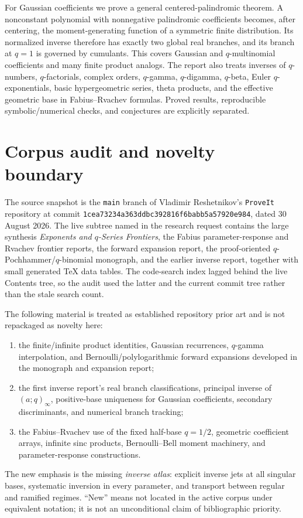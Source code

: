 \documentclass[11pt,letterpaper,oneside,openany]{book}
\theoremstyle{definition}
\theoremstyle{remark}
\begin{document}
For Gaussian coefficients we prove a general centered-palindromic theorem.  A
nonconstant polynomial with nonnegative palindromic coefficients becomes, after
centering, the moment-generating function of a symmetric finite distribution.
Its normalized inverse therefore has exactly two global real branches, and its
branch at \(q=1\) is governed by cumulants.  This covers Gaussian and
\(q\)-multinomial coefficients and many finite product analogs.  The report also
treats inverses of \(q\)-numbers, \(q\)-factorials, complex orders,
\(q\)-gamma, \(q\)-digamma, \(q\)-beta, Euler \(q\)-exponentials, basic
hypergeometric series, theta products, and the effective geometric base in
Fabius--Rvachev formulas.  Proved results, reproducible symbolic/numerical
checks, and conjectures are explicitly separated.

\chapter*{Corpus audit and novelty boundary}
The source snapshot is the \texttt{main} branch of Vladimir Reshetnikov's
\texttt{ProveIt} repository at commit
\texttt{1cea73234a363ddbc392816f6babb5a57920e984}, dated 30 August 2026.
The live subtree named in the research request contains the large synthesis
\emph{Exponents and \(q\)-Series Frontiers}, the Fabius parameter-response and
Rvachev frontier reports, the forward expansion report, the proof-oriented
\(q\)-Pochhammer/\(q\)-binomial monograph, and the earlier inverse report,
together with small generated TeX data tables.  The code-search index lagged
behind the live Contents tree, so the audit used the latter and the current
commit tree rather than the stale search count.

The following material is treated as established repository prior art and is
not repackaged as novelty here:
\begin{enumerate}
\item the finite/infinite product identities, Gaussian recurrences,
      \(q\)-gamma interpolation, and Bernoulli/polylogarithmic forward
      expansions developed in the monograph and expansion report;
\item the first inverse report's real branch classifications, principal inverse
      of \((a;q)_\infty\), positive-base uniqueness for Gaussian coefficients,
      secondary discriminants, and numerical branch tracking;
\item the Fabius--Rvachev use of the fixed half-base \(q=1/2\), geometric
      coefficient arrays, infinite sinc products, Bernoulli--Bell moment
      machinery, and parameter-response constructions.
\end{enumerate}
The new emphasis is the missing \emph{inverse atlas}: explicit inverse jets at
all singular bases, systematic inversion in every parameter, and transport
between regular and ramified regimes.  ``New'' means not located in the active
corpus under equivalent notation; it is not an unconditional claim of
bibliographic priority.
\end{document}
